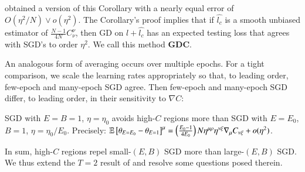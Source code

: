             \noindent
            \cite{ro19} obtained a version of this Corollary with a nearly
            equal error of $O(\eta^2/N)\vee o(\eta^2)$.  The Corollary's proof
            implies that if $\hat{l_c}$ is a
            smooth unbiased estimator of $\frac{N-1}{4 N}
            C^{\nu}_{\nu}$, then GD on $l + \hat{l_c}$ has an expected testing
            loss that agrees with SGD's to order $\eta^2$.  We call this method
            \textbf{GDC}.

            An analogous form of averaging occurs over multiple epochs.  For a
            tight comparison, we scale the learning rates appropriately so
            that, to leading order, few-epoch and many-epoch SGD agree.  Then
            few-epoch and many-epoch SGD differ, to leading order, in their
            sensitivity to $\nabla C$:
            \begin{cor}[$\sdia{c(01-2)(01-12)}$] \label{cor:epochs}
                SGD with $E=B=1$, $\eta=\eta_0$ avoids high-$C$ regions more
                than SGD with $E=E_0$, $B=1$, $\eta=\eta_0/E_0$.  Precisely:
                $
                    \mathbb{E}\left[\theta_{E=E_0} - \theta_{E=1}\right]^\mu
                        =
                    \left(\frac{E_0-1}{4 E_0}\right) N
                    \eta^{\mu\rho} \eta^{\nu\xi} \nabla_\mu C_{\nu\xi}
                    + o(\eta^2)
                $.
            \end{cor}

            In sum, high-$C$ regions repel small-$(E,B)$ SGD more than
            large-$(E,B)$ SGD.  We thus extend the $T=2$ result of \cite{ro18}
            and resolve some questions posed therein.    

 
